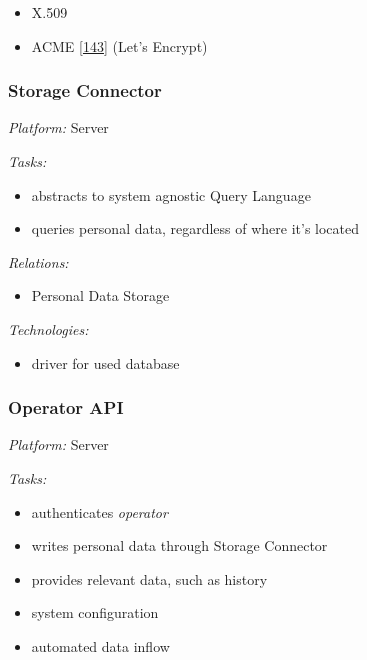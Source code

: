 \documentclass[12pt,english,a4paper,titlepage,cleardoublepage=empty,dottedtoc]{report}
\providecommand{\tightlist}{%
  \setlength{\itemsep}{0pt}\setlength{\parskip}{0pt}}
\begin{document}
\begin{itemize}
\tightlist
\item
  X.509
\item
  ACME {[}\protect\hyperlink{ref-web_spec_acme}{143}{]} (Let's Encrypt)
\end{itemize}

\subsubsection*{Storage Connector}\label{storage-connector}

\emph{Platform:} Server

\emph{Tasks:}

\begin{itemize}
\tightlist
\item
  abstracts to system agnostic Query Language
\item
  queries personal data, regardless of where it's located
\end{itemize}

\emph{Relations:}

\begin{itemize}
\tightlist
\item
  Personal Data Storage
\end{itemize}

\emph{Technologies:}

\begin{itemize}
\tightlist
\item
  driver for used database
\end{itemize}

\subsubsection*{Operator API}\label{operator-api}

\emph{Platform:} Server

\emph{Tasks:}

\begin{itemize}
\tightlist
\item
  authenticates \emph{operator}
\item
  writes personal data through Storage Connector
\item
  provides relevant data, such as history
\item
  system configuration
\item
  automated data inflow
\end{itemize}
\end{document}
